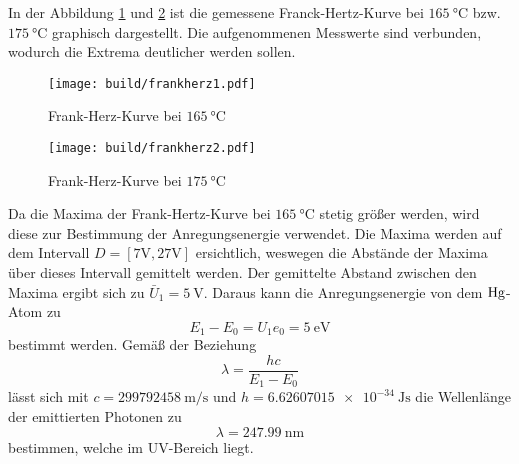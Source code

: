 In der Abbildung \ref{fig:frankherz1} und \ref{fig:frankherz2} ist die gemessene Franck-Hertz-Kurve bei $\SI{165}{\celsius}$ bzw. $\SI{175}{\celsius}$ 
graphisch dargestellt.
Die aufgenommenen Messwerte sind verbunden, wodurch die Extrema deutlicher werden sollen.
\begin{figure}
    \centering
    \caption{Frank-Herz-Kurve bei $\SI{165}{\celsius}$}
    \label{fig:frankherz1}
    \texttt{[image: build/frankherz1.pdf]}
\end{figure}
\begin{figure}
    \centering
    \caption{Frank-Herz-Kurve bei $\SI{175}{\celsius}$}
    \label{fig:frankherz2}
    \texttt{[image: build/frankherz2.pdf]}
\end{figure}
Da die Maxima der Frank-Hertz-Kurve bei $\SI{165}{\celsius}$ stetig größer werden, wird diese zur Bestimmung der Anregungsenergie verwendet.
Die Maxima werden auf dem Intervall $D = [7\si{\volt}, 27\si{\volt}]$ ersichtlich, weswegen die Abstände der Maxima über dieses Intervall gemittelt werden.
Der gemittelte Abstand zwischen den Maxima ergibt sich zu $\bar{U}_\text{1} = \SI{5}{\volt}$.
Daraus kann die Anregungsenergie von dem $\ce{Hg}$-Atom zu 
\begin{equation*}
    E_1 - E_0 = U_1 e_0 = \SI{5}{\electronvolt}
\end{equation*}
bestimmt werden.
Gemäß der Beziehung
\begin{equation*}
    \lambda =  \frac{hc}{E_1 - E_0}
\end{equation*}
lässt sich mit $c = \SI{299792458}{\metre\per\second}$\cite{speedoflight} und $h = \SI{6.62607015e-34}{\joule\second}$\cite{plank}
die Wellenlänge der emittierten Photonen zu
\begin{equation*}
    \lambda = \SI{247.99}{\nano\metre}
\end{equation*}
bestimmen, welche im UV-Bereich liegt.